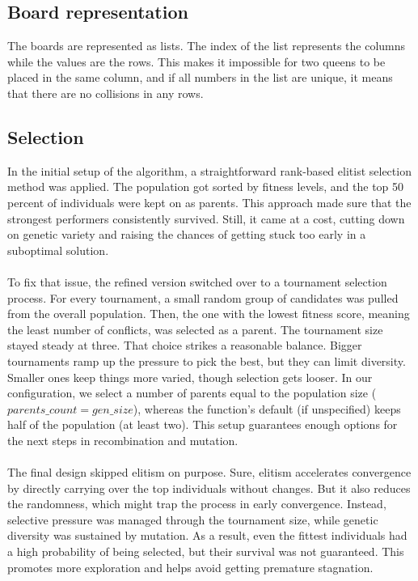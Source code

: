 \documentclass{scrartcl}
\begin{document}
\subsection*{Board representation} 
The boards are represented as lists. The index of the list represents the columns while the values are the rows. This makes it impossible for two queens to be placed in the same column, and if all numbers in the list are unique, it means that there are no collisions in any rows.

\subsection*{Selection} 
In the initial setup of the algorithm, a straightforward rank-based elitist selection method was applied. The population got sorted by fitness levels, and the top 50 percent of individuals were kept on as parents. This approach made sure that the strongest performers consistently survived. Still, it came at a cost, cutting down on genetic variety and raising the chances of getting stuck too early in a suboptimal solution. \\ \\ To fix that issue, the refined version switched over to a tournament selection process. For every tournament, a small random group of candidates was pulled from the overall population. Then, the one with the lowest fitness score, meaning the least number of conflicts, was selected as a parent. The tournament size stayed steady at three. That choice strikes a reasonable balance. Bigger tournaments ramp up the pressure to pick the best, but they can limit diversity. Smaller ones keep things more varied, though selection gets looser. In our configuration, we select a number of parents equal to the population size ($parents\_count = gen\_size$), whereas the function’s default (if unspecified) keeps half of the population (at least two). This setup guarantees enough options for the next steps in recombination and mutation. \\ \\ The final design skipped elitism on purpose. Sure, elitism accelerates convergence by directly carrying over the top individuals without changes. But it also reduces the randomness, which might trap the process in early convergence. Instead, selective pressure was managed through the tournament size, while genetic diversity was sustained by mutation. As a result, even the fittest individuals had a high probability of being selected, but their survival was not guaranteed. This promotes more exploration and helps avoid getting premature stagnation.
\end{document}
